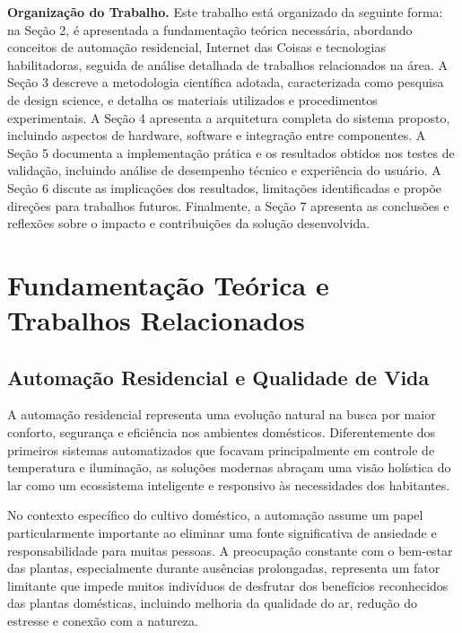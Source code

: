 \documentclass[twoside,english,brazilian]{UNISINOSmonografia}
\begin{document}
\noindent\textbf{Organização do Trabalho.} Este trabalho está organizado da seguinte forma: na Seção 2, é apresentada a fundamentação teórica necessária, abordando conceitos de automação residencial, Internet das Coisas e tecnologias habilitadoras, seguida de análise detalhada de trabalhos relacionados na área. A Seção 3 descreve a metodologia científica adotada, caracterizada como pesquisa de design science, e detalha os materiais utilizados e procedimentos experimentais. A Seção 4 apresenta a arquitetura completa do sistema proposto, incluindo aspectos de hardware, software e integração entre componentes. A Seção 5 documenta a implementação prática e os resultados obtidos nos testes de validação, incluindo análise de desempenho técnico e experiência do usuário. A Seção 6 discute as implicações dos resultados, limitações identificadas e propõe direções para trabalhos futuros. Finalmente, a Seção 7 apresenta as conclusões e reflexões sobre o impacto e contribuições da solução desenvolvida.

\chapter{Fundamentação Teórica e Trabalhos Relacionados}

\section{Automação Residencial e Qualidade de Vida}

A automação residencial representa uma evolução natural na busca por maior conforto, segurança e eficiência nos ambientes domésticos. Diferentemente dos primeiros sistemas automatizados que focavam principalmente em controle de temperatura e iluminação, as soluções modernas abraçam uma visão holística do lar como um ecossistema inteligente e responsivo às necessidades dos habitantes.

No contexto específico do cultivo doméstico, a automação assume um papel particularmente importante ao eliminar uma fonte significativa de ansiedade e responsabilidade para muitas pessoas. A preocupação constante com o bem-estar das plantas, especialmente durante ausências prolongadas, representa um fator limitante que impede muitos indivíduos de desfrutar dos benefícios reconhecidos das plantas domésticas, incluindo melhoria da qualidade do ar, redução do estresse e conexão com a natureza.
\end{document}
